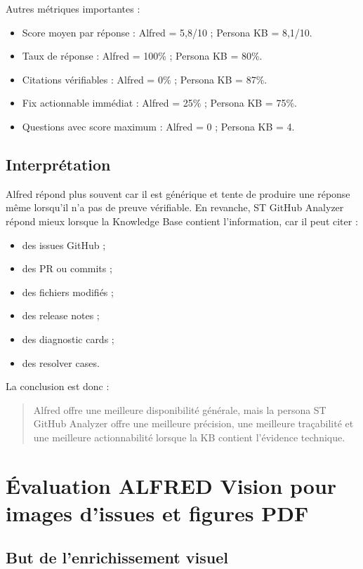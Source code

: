 \documentclass[11pt,a4paper]{article}
\begin{document}
Autres métriques importantes :

\begin{itemize}
  \item Score moyen par réponse : Alfred = 5,8/10 ; Persona KB = 8,1/10.
  \item Taux de réponse : Alfred = 100\% ; Persona KB = 80\%.
  \item Citations vérifiables : Alfred = 0\% ; Persona KB = 87\%.
  \item Fix actionnable immédiat : Alfred = 25\% ; Persona KB = 75\%.
  \item Questions avec score maximum : Alfred = 0 ; Persona KB = 4.
\end{itemize}

\subsection{Interprétation}

Alfred répond plus souvent car il est générique et tente de produire une réponse même lorsqu'il n'a pas de preuve vérifiable. En revanche, ST GitHub Analyzer répond mieux lorsque la Knowledge Base contient l'information, car il peut citer :

\begin{itemize}
  \item des issues GitHub ;
  \item des PR ou commits ;
  \item des fichiers modifiés ;
  \item des release notes ;
  \item des diagnostic cards ;
  \item des resolver cases.
\end{itemize}

La conclusion est donc :

\begin{quote}
Alfred offre une meilleure disponibilité générale, mais la persona ST GitHub Analyzer offre une meilleure précision, une meilleure traçabilité et une meilleure actionnabilité lorsque la KB contient l'évidence technique.
\end{quote}

\section{Évaluation ALFRED Vision pour images d'issues et figures PDF}

\subsection{But de l'enrichissement visuel}
\end{document}
